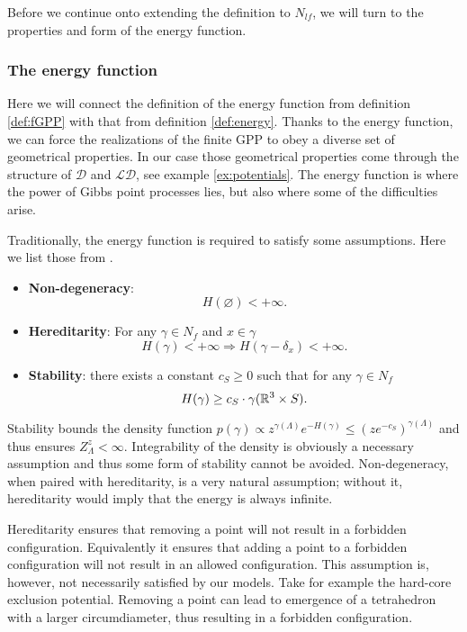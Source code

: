 Before we continue onto extending the definition to $N_{lf}$, we will turn to the properties and form of the energy function.


\subsubsection{The energy function}
Here we will connect the definition of the energy function from definition \ref{def:fGPP} with that from definition \ref{def:energy}. Thanks to the energy function, we can force the realizations of the finite GPP to obey a diverse set of geometrical properties. In our case those geometrical properties come through the structure of $\mathcal D$ and $\mathcal {LD}$, see example \ref{ex:potentials}.  
The energy function is where the power of Gibbs point processes lies, but also where some of the difficulties arise. 

Traditionally, the energy function is required to satisfy some assumptions. Here we list those from \cite{Dereudre2017}.
\begin{itemize}
	\item \textbf{Non-degeneracy}:
		$$H(\varnothing) < +\infty.$$
	\item \textbf{Hereditarity}: For any $\gamma \in N_f$ and $x\in \gamma$
		$$H(\gamma)< + \infty \Rightarrow H(\gamma - \delta_x) < +\infty.$$
	\item \textbf{Stability}: there exists a constant $c_S\geq 0$ such that for any $\gamma \in N_f$
		$$H(\gamma) \geq c_S\cdot \gamma({\mathbb R^3}\times S).$$
\end{itemize}

Stability bounds the density function $p(\gamma) \propto z^{\gamma(\Lambda)}e^{-H(\gamma)} \leq (z e^{-c_S})^{\gamma(\Lambda)} $ and thus ensures $Z^z_\Lambda < \infty$. Integrability of the density is obviously a necessary assumption and thus some form of stability cannot be avoided. 
Non-degeneracy, when paired with hereditarity, is a very natural assumption; without it, hereditarity would imply that the energy is always infinite.

Hereditarity ensures that removing a point will not result in a forbidden configuration. Equivalently it ensures that adding a point to a forbidden configuration will not result in an allowed configuration. This assumption is, however, not necessarily satisfied by our models. Take for example the hard-core exclusion potential. Removing a point can lead to emergence of a tetrahedron with a larger circumdiameter, thus resulting in a forbidden configuration.

